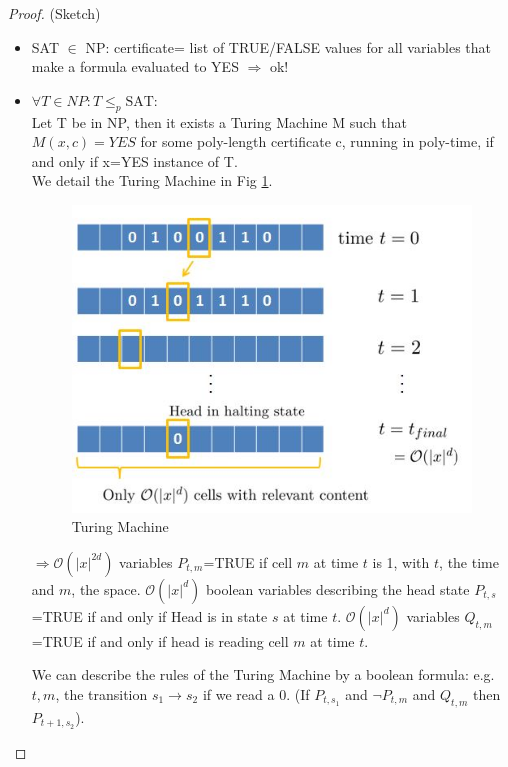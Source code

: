 \begin{proof}
(Sketch) 
\begin{itemize}
\item SAT $\in$ NP: certificate= list of TRUE/FALSE values for all variables that make a formula evaluated to YES $\Rightarrow$ ok!
\item  $\forall T \in NP: T \leq_p \text{SAT}$: \\ Let T be in NP, then it exists a Turing Machine M such that $M(x,c)=YES$ for some poly-length certificate c, running in poly-time, if and only if x=YES instance of T.\\
 
We detail the Turing Machine in Fig \ref{c12:turing machine}. 

\begin{figure}[h!]
\centering
\includegraphics[scale=0.7]{images/fig_2.jpg}
\caption{Turing Machine}
\label{c12:turing machine}
\end{figure}

 $\Rightarrow \mathcal{O}\left( \vert x \vert^{2d} \right)$ variables $P_{t,m}$=TRUE if cell $m$ at time $t$ is 1, with $t$, the time and $m$, the space. $\mathcal{O}\left( \vert x \vert^{d} \right)$ boolean variables describing the head state $P_{t,s}$=TRUE if and only if Head is in state $s$ at time $t$. $\mathcal{O}\left( \vert x \vert^{d} \right)$ variables $Q_{t,m}$=TRUE if and only if head is reading cell $m$ at time $t$. 
 
 We can describe the rules of the Turing Machine by a boolean formula: e.g. $t,m$, the transition $s_1 \longrightarrow s_2$ if we read a $0$. (If $P_{t,s_1}$ and $\neg P_{t,m}$ and $Q_{t,m}$ then $P_{t+1,s_2}$).
 

\end{itemize}
\end{proof}
